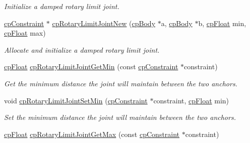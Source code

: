 \begin{DoxyCompactItemize}
\begin{DoxyCompactList}\small\item\em Initialize a damped rotary limit joint. \end{DoxyCompactList}\item 
\hypertarget{group__cp_rotary_limit_joint_gaaa34430075cb2b674d73c66b667a4a36}{}\hyperlink{structcp_constraint}{cp\+Constraint} $\ast$ \hyperlink{group__cp_rotary_limit_joint_gaaa34430075cb2b674d73c66b667a4a36}{cp\+Rotary\+Limit\+Joint\+New} (\hyperlink{structcp_body}{cp\+Body} $\ast$a, \hyperlink{structcp_body}{cp\+Body} $\ast$b, \hyperlink{group__basic_types_gac1ed65573e035bf892505768c852d8d3}{cp\+Float} min, \hyperlink{group__basic_types_gac1ed65573e035bf892505768c852d8d3}{cp\+Float} max)\label{group__cp_rotary_limit_joint_gaaa34430075cb2b674d73c66b667a4a36}

\begin{DoxyCompactList}\small\item\em Allocate and initialize a damped rotary limit joint. \end{DoxyCompactList}\item 
\hypertarget{group__cp_rotary_limit_joint_ga47c05e7be5cf5c04bbce64c36b772ccc}{}\hyperlink{group__basic_types_gac1ed65573e035bf892505768c852d8d3}{cp\+Float} \hyperlink{group__cp_rotary_limit_joint_ga47c05e7be5cf5c04bbce64c36b772ccc}{cp\+Rotary\+Limit\+Joint\+Get\+Min} (const \hyperlink{structcp_constraint}{cp\+Constraint} $\ast$constraint)\label{group__cp_rotary_limit_joint_ga47c05e7be5cf5c04bbce64c36b772ccc}

\begin{DoxyCompactList}\small\item\em Get the minimum distance the joint will maintain between the two anchors. \end{DoxyCompactList}\item 
\hypertarget{group__cp_rotary_limit_joint_ga05d5e5724e6c25c3c229b8106ea90836}{}void \hyperlink{group__cp_rotary_limit_joint_ga05d5e5724e6c25c3c229b8106ea90836}{cp\+Rotary\+Limit\+Joint\+Set\+Min} (\hyperlink{structcp_constraint}{cp\+Constraint} $\ast$constraint, \hyperlink{group__basic_types_gac1ed65573e035bf892505768c852d8d3}{cp\+Float} min)\label{group__cp_rotary_limit_joint_ga05d5e5724e6c25c3c229b8106ea90836}

\begin{DoxyCompactList}\small\item\em Set the minimum distance the joint will maintain between the two anchors. \end{DoxyCompactList}\item 
\hypertarget{group__cp_rotary_limit_joint_ga73a5032c961a58d22801ea07d728fd9a}{}\hyperlink{group__basic_types_gac1ed65573e035bf892505768c852d8d3}{cp\+Float} \hyperlink{group__cp_rotary_limit_joint_ga73a5032c961a58d22801ea07d728fd9a}{cp\+Rotary\+Limit\+Joint\+Get\+Max} (const \hyperlink{structcp_constraint}{cp\+Constraint} $\ast$constraint)\label{group__cp_rotary_limit_joint_ga73a5032c961a58d22801ea07d728fd9a}


\end{DoxyCompactItemize}
